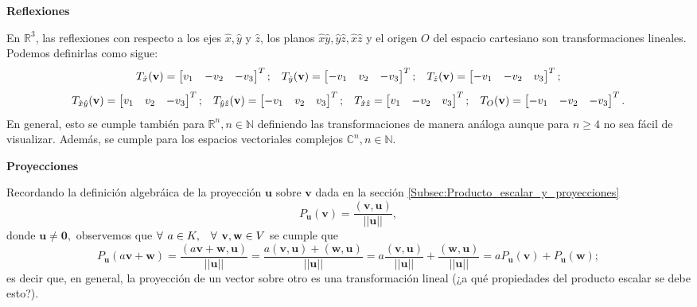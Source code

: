 \documentclass[12pt]{article}
\begin{document}
\textbf{Reflexiones} 

En $\mathbb{R}^3$, las reflexiones con respecto a los ejes $\hat{x},\hat{y}$ y $\hat{z}$, los planos $\hat{x}\hat{y}, \hat{y}\hat{z}, \hat{x}\hat{z}$ y el origen $O$ del espacio cartesiano son transformaciones lineales. Podemos definirlas como sigue: \[
    T_{\hat{x}}(\mathbf{v}) = \begin{bmatrix} v_1&-v_2&-v_3 \end{bmatrix}^T; \hspace{3mm} T_{\hat{y}}(\mathbf{v})=\begin{bmatrix} -v_1&v_2&-v_3 \end{bmatrix}^T; \hspace{3mm} T_{\hat{z}}(\mathbf{v}) = \begin{bmatrix} -v_1 & -v_2 & v_3 \end{bmatrix}^T
    ;\]\[ T_{\hat{x}\hat{y}}(\mathbf{v})=\begin{bmatrix} v_1&v_2&-v_3 \end{bmatrix}^T; \hspace{3mm}  T_{\hat{y}\hat{z}}(\mathbf{v}) = \begin{bmatrix} -v_1&v_2&v_3 \end{bmatrix}^T; \hspace{3mm} T_{\hat{x}\hat{z}} = \begin{bmatrix} v_1&-v_2&v_3 \end{bmatrix}^T; \hspace{3mm}  T_O(\mathbf{v})=\begin{bmatrix} -v_1&-v_2&-v_3 \end{bmatrix}^T 
.\] \noindent En general, esto se cumple también para $\mathbb{R}^n, n\in\mathbb{N}$ definiendo las transformaciones de manera análoga \textemdash aunque para $n\ge 4$ no sea fácil de visualizar. Además, se cumple para los espacios vectoriales complejos $\mathbb{C}^n, n\in\mathbb{N}.$ 
\vspace{3mm}

\textbf{Proyecciones}

Recordando la definición algebráica de la proyección $\mathbf{u}$ sobre $\mathbf{v}$ dada en la sección \ref{Subsec:Producto_escalar_y_proyecciones} \[
    P_{\mathbf{u}}(\mathbf{v}) = \frac{(\mathbf{v},\mathbf{u})}{||\mathbf{u}||}
,\] \noindent donde $\mathbf{u}\neq\mathbf{0},$ observemos que $\forall \hspace{1.5mm} a\in K, \hspace{3mm} \forall\hspace{1.5mm}\mathbf{v},\mathbf{w}\in V$ se cumple que \[
P_{\mathbf{u}}(a\mathbf{v}+\mathbf{w})=\frac{(a\mathbf{v}+\mathbf{w},\mathbf{u})}{||\mathbf{u}||} = \frac{a(\mathbf{v},\mathbf{u})+(\mathbf{w},\mathbf{u})}{||\mathbf{u}||} = a\frac{(\mathbf{v},\mathbf{u})}{||\mathbf{u}||}+\frac{(\mathbf{w},\mathbf{u})}{||\mathbf{u}||}=a P_{\mathbf{u}}(\mathbf{v})+P_{\mathbf{u}}(\mathbf{w})  
;\] \noindent es decir que, en general, la proyección de un vector sobre otro es una transformación lineal (¿a qué propiedades del producto escalar se debe esto?).
\end{document}

